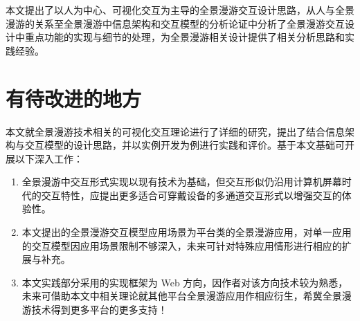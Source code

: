 本文提出了以人为中心、可视化交互为主导的全景漫游交互设计思路，从人与全景漫游的关系至全景漫游中信息架构和交互模型的分析论证中分析了全景漫游交互设计中重点功能的实现与细节的处理，为全景漫游相关设计提供了相关分析思路和实践经验。

\section{有待改进的地方}
本文就全景漫游技术相关的可视化交互理论进行了详细的研究，提出了结合信息架构与交互模型的设计思路，并以实例开发为例进行实践和评价。基于本文基础可开展以下深入工作：
\begin{enumerate}
	\item 全景漫游中交互形式实现以现有技术为基础，但交互形似仍沿用计算机屏幕时代的交互特性，应提出更多适合可穿戴设备的多通道交互形式以增强交互的体验性。
	\item 本文提出的全景漫游交互模型应用场景为平台类的全景漫游应用，对单一应用的交互模型因应用场景限制不够深入，未来可针对特殊应用情形进行相应的扩展与补充。
    \item 本文实践部分采用的实现框架为 Web 方向，因作者对该方向技术较为熟悉，未来可借助本文中相关理论就其他平台全景漫游应用作相应衍生，希冀全景漫游技术得到更多平台的更多支持！
\end{enumerate}